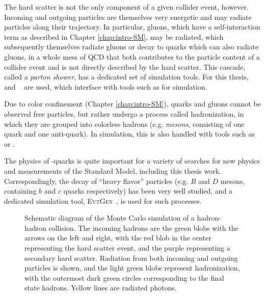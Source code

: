 The hard scatter is not the only component of a given collider event, however. Incoming and outgoing 
particles are themselves very energetic and may radiate particles along their trajectory. In particular,
gluons, which have a self-interaction term as described in Chapter \ref{chap:intro-SM}, may be radiated,  
which subsequently themselves radiate gluons or decay to quarks which can also radiate gluons, in a 
whole mess of QCD that both contributes to the particle content of a collider event and is not directly 
described by the hard scatter. This cascade, called a \emph{parton shower}, has a dedicated set of simulation
tools. For this thesis, \HERWIG[7]~\cite{Herwig7}\cite{HerwigPP} and \PYTHIA[8]~\cite{Pythia} are used, which 
interface with tools such as \MADGRAPH for simulation. 

Due to color confinement (Chapter \ref{chap:intro-SM}), quarks and gluons cannot be observed free particles, but 
rather undergo a process called hadronization, in which they are grouped into colorless hadrons (e.g. \emph{mesons},
consisting of one quark and one anti-quark). In simulation, this is also handled with tools such as \HERWIG[7] or \PYTHIA[8].

The physics of \Pqb-quarks is quite important for a variety of searches for new physics and measurements of 
the Standard Model, including this thesis work. Correspondingly, the decay of ``heavy flavor'' particles 
(e.g. $B$ and $D$ mesons, containing $b$ and $c$ quarks respectively) has been very well studied, and 
a dedicated simulation tool, \textsc{EvtGen}~\cite{EvtGen}, is used for such processes.

\begin{figure}[ht]
\centering
{}
\caption{\label{fig:parton-shower} Schematic diagram of the Monte Carlo simulation of a hadron-hadron collision. The 
incoming hadrons are the green blobs with the arrows on the left and right, with the red blob in the center 
representing the hard scatter event, and the purple representing a secondary hard scatter. Radiation from 
both incoming and outgoing particles is shown, and the light green blobs represent hadronization, with the outermost 
dark green circles corresponding to the final state hadrons. Yellow lines are radiated photons. ~\cite{parton-shower}}
\end{figure}


